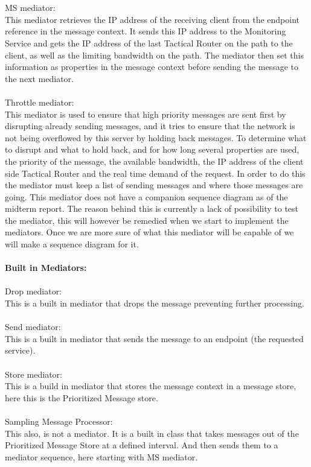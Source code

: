 \\\\
MS mediator:\\
    This mediator retrieves the IP address of the receiving client from the endpoint reference in the message context. It sends this IP address to the Monitoring Service and gets the IP address of the last Tactical Router on the path to the client, as well as the limiting bandwidth on the path. The mediator then set this information as properties in the message context before sending the message to the next mediator.
\\\\
Throttle mediator:\\
    This mediator is used to ensure that high priority messages are sent first by disrupting already sending messages, and it tries to ensure that the network is not being overflowed by this server by holding back messages. To determine what to disrupt and what to hold back, and for how long several properties are used, the priority of the message, the available bandwidth, the IP address of the client side Tactical Router and the real time demand of the request. In order to do this the mediator must keep a list of sending messages and where those messages are going. This mediator does not have a companion sequence diagram as of the midterm report. The reason behind this is currently a lack of possibility to test the mediator, this will however be remedied when we start to implement the mediators. Once we are more sure of what this mediator will be capable of we will make a sequence diagram for it.
\\\\
\textbf{Built in Mediators:}\\\\
Drop mediator:\\
    This is a built in mediator that drops the message preventing further processing.
\\\\
Send mediator:\\
    This is a built in mediator that sends the message to an endpoint (the requested service).
\\\\
Store mediator:\\
    This is a build in mediator that stores the message context in a message store, here this is the Prioritized Message store.
\\\\
Sampling Message Processor:\\
    This also, is not a mediator. It is a built in class that takes messages out of the Prioritized Message Store at a defined interval. And then sends them to a mediator sequence, here starting with MS mediator.

